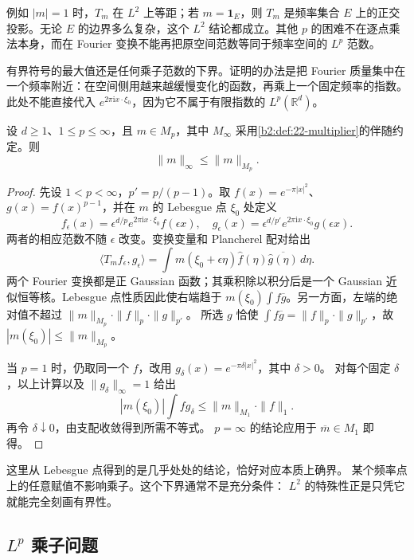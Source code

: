 例如 \(|m|=1\) 时，\(T_m\) 在 \(L^2\) 上等距；若 \(m=\mathbf1_E\)，则 \(T_m\) 是频率集合 \(E\) 上的正交投影。无论 \(E\) 的边界多么复杂，这个 \(L^2\) 结论都成立。其他 \(p\) 的困难不在逐点乘法本身，而在 Fourier 变换不能再把原空间范数等同于频率空间的 \(L^p\) 范数。

\ProseParagraphBreak
有界符号的最大值还是任何乘子范数的下界。证明的办法是把 Fourier 质量集中在一个频率附近：在空间侧用越来越缓慢变化的函数，再乘上一个固定频率的指数。此处不能直接代入 \(e^{2\pi\mathrm i x\cdot\xi_0}\)，因为它不属于有限指数的 \(L^p(\mathbb R^d)\)。

\begin{proposition}[符号的必要界]\label{b2:prop:22-symbol-bound}
设 \(d\geq1\)、\(1\leq p\leq\infty\)，且 \(m\in M_p\)，其中
\(M_\infty\) 采用\cref{b2:def:22-multiplier}的伴随约定。则
\[
 \|m\|_\infty\leq\|m\|_{M_p}.
\]
\end{proposition}
\begin{proof}
先设 \(1<p<\infty\)，\(p'=p/(p-1)\)。取
\(f(x)=e^{-\pi|x|^2}\)、\(g(x)=f(x)^{p-1}\)，并在 \(m\) 的 Lebesgue 点
\(\xi_0\) 处定义
\[
 f_\epsilon(x)=\epsilon^{d/p}e^{2\pi\mathrm i x\cdot\xi_0}f(\epsilon x),
 \quad
 g_\epsilon(x)=\epsilon^{d/p'}e^{2\pi\mathrm i x\cdot\xi_0}g(\epsilon x).
\]
两者的相应范数不随 \(\epsilon\) 改变。变换变量和 Plancherel 配对给出
\[
 \langle T_m f_\epsilon,g_\epsilon\rangle
 =\int m(\xi_0+\epsilon\eta)\widehat f(\eta)
       \overline{\widehat g(\eta)}\,d\eta.
\]
两个 Fourier 变换都是正 Gaussian 函数；其乘积除以积分后是一个
Gaussian 近似恒等核。Lebesgue 点性质因此使右端趋于
\(m(\xi_0)\int f\overline g\)。另一方面，左端的绝对值不超过
\(\|m\|_{M_p}\cdot\|f\|_p\cdot\|g\|_{p'}\)。
所选 \(g\) 恰使
\(\int f\overline g=\|f\|_p\cdot\|g\|_{p'}\)，故
\(|m(\xi_0)|\leq\|m\|_{M_p}\)。

当 \(p=1\) 时，仍取同一个 \(f\)，改用
\(g_\delta(x)=e^{-\pi\delta|x|^2}\)，其中 \(\delta>0\)。
对每个固定 \(\delta\)，以上计算以及 \(\|g_\delta\|_\infty=1\) 给出
\[
 |m(\xi_0)|\int f g_\delta\leq\|m\|_{M_1}\cdot\|f\|_1.
\]
再令 \(\delta\downarrow0\)，由支配收敛得到所需不等式。
\(p=\infty\) 的结论应用于 \(\overline m\in M_1\) 即得。
\end{proof}

这里从 Lebesgue 点得到的是几乎处处的结论，恰好对应本质上确界。
某个频率点上的任意赋值不影响乘子。这个下界通常不是充分条件：
\(L^2\) 的特殊性正是只凭它就能完全刻画有界性。

\subsection{\texorpdfstring{\(L^p\)}{Lp} 乘子问题}
\label{b2:subsec:220103}

